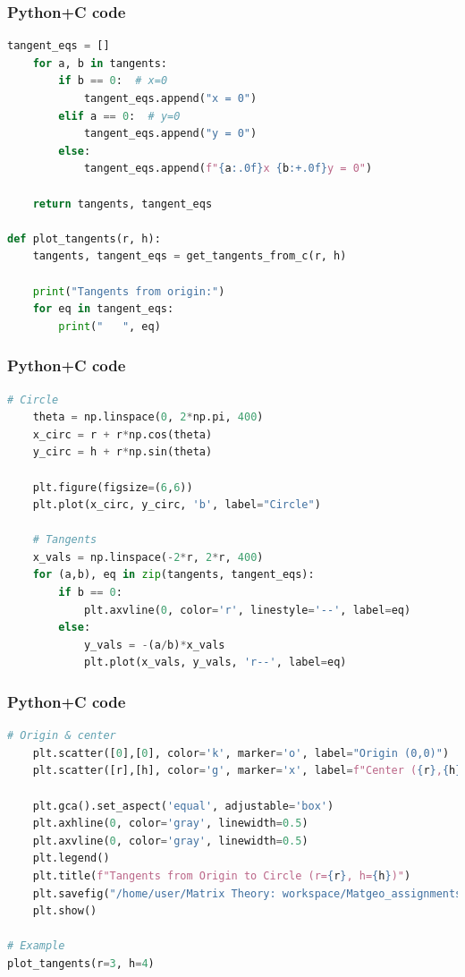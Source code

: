 \documentclass{beamer}
\begin{document}
\begin{frame}[fragile]
    \frametitle{Python+C code}

    \begin{lstlisting}[language=Python]
 tangent_eqs = []
    for a, b in tangents:
        if b == 0:  # x=0
            tangent_eqs.append("x = 0")
        elif a == 0:  # y=0
            tangent_eqs.append("y = 0")
        else:
            tangent_eqs.append(f"{a:.0f}x {b:+.0f}y = 0")

    return tangents, tangent_eqs

def plot_tangents(r, h):
    tangents, tangent_eqs = get_tangents_from_c(r, h)

    print("Tangents from origin:")
    for eq in tangent_eqs:
        print("   ", eq)
    \end{lstlisting}
\end{frame}

\begin{frame}[fragile]
    \frametitle{Python+C code}

    \begin{lstlisting}[language=Python]
 # Circle
    theta = np.linspace(0, 2*np.pi, 400)
    x_circ = r + r*np.cos(theta)
    y_circ = h + r*np.sin(theta)

    plt.figure(figsize=(6,6))
    plt.plot(x_circ, y_circ, 'b', label="Circle")

    # Tangents
    x_vals = np.linspace(-2*r, 2*r, 400)
    for (a,b), eq in zip(tangents, tangent_eqs):
        if b == 0:
            plt.axvline(0, color='r', linestyle='--', label=eq)
        else:
            y_vals = -(a/b)*x_vals
            plt.plot(x_vals, y_vals, 'r--', label=eq)
    \end{lstlisting}
\end{frame}

\begin{frame}[fragile]
    \frametitle{Python+C code}

    \begin{lstlisting}[language=Python]
# Origin & center
    plt.scatter([0],[0], color='k', marker='o', label="Origin (0,0)")
    plt.scatter([r],[h], color='g', marker='x', label=f"Center ({r},{h})")

    plt.gca().set_aspect('equal', adjustable='box')
    plt.axhline(0, color='gray', linewidth=0.5)
    plt.axvline(0, color='gray', linewidth=0.5)
    plt.legend()
    plt.title(f"Tangents from Origin to Circle (r={r}, h={h})")
    plt.savefig("/home/user/Matrix Theory: workspace/Matgeo_assignments/10.7.75/figs/figure_1.png")
    plt.show()

# Example
plot_tangents(r=3, h=4)


    \end{lstlisting}
\end{frame}
\end{document}
